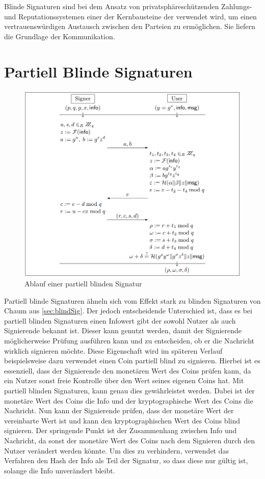 \documentclass{scrreprt}
\begin{document}
Blinde Signaturen sind bei dem Ansatz von privatsphäreschützenden Zahlungs- und Reputationssystemen einer der Kernbausteine der verwendet wird, um einen vertrauenswürdigen Austausch zwischen den Parteien zu ermöglichen. Sie liefern die Grundlage der Kommunikation.

\section{Partiell Blinde Signaturen}
\label{sec:partBlindSig}
\begin{figure}[h]
    \label{fig:partBlindSig}
    \centering
    \includegraphics*[width=1\textwidth]{partBlindSig.png}
    \caption{Ablauf einer partiell blinden Signatur \cite{abe2000provably}}
\end{figure}
Partiell blinde Signaturen ähneln sich vom Effekt stark zu blinden Signaturen von Chaum aus \ref{sec:blindSig}. Der jedoch entscheidende Unterschied ist, dass es bei partiell blinden Signaturen einen Infowert gibt der sowohl Nutzer als auch Signierende bekannt ist. Dieser kann genutzt werden, damit der Signierende möglicherweise Prüfung ausführen kann und zu entscheiden, ob er die Nachricht wirklich signieren möchte. Diese Eigenschaft wird im späteren Verlauf beispielsweise dazu verwendet einen Coin partiell blind zu signieren. Hierbei ist es essenziell, dass der Signierende den monetären Wert des Coins prüfen kann, da ein Nutzer sonst freie Kontrolle über den Wert seines eigenen Coins hat. Mit partiell blinden Signaturen, kann genau dies gewährleistet werden. Dabei ist der monetäre Wert des Coins die Info und der kryptographische Wert des Coins die Nachricht. Nun kann der Signierende prüfen, dass der monetäre Wert der vereinbarte Wert ist und kann den kryptographischen Wert des Coins blind signieren. Der springende Punkt ist der Zusammenhang zwischen Info und Nachricht, da sonst der monetäre Wert des Coins nach dem Signieren durch den Nutzer verändert werden könnte. Um dies zu verhindern, verwendet das Verfahren den Hash der Info als Teil der Signatur, so dass diese nur gültig ist, solange die Info unverändert bleibt.
\end{document}
